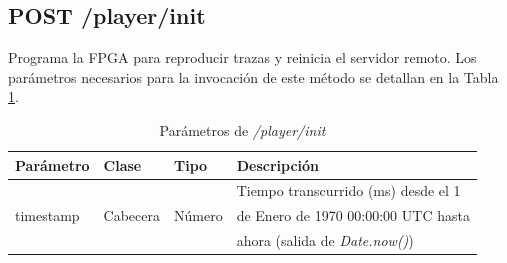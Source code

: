 %
%
\subsection{POST /player/init}

Programa la \gls{FPGA} para reproducir \glspl{traza} y reinicia el servidor remoto. Los parámetros necesarios para la invocación de este método se detallan en la Tabla \ref{extra:api:playerinit:invocacion}.

\begin{table}[H]
\centering
\begin{tabular}{|l|l|l|l|}
\hline
\rowcolor[HTML]{F5F5F5}
\textbf{Parámetro}  & \textbf{Clase} & \textbf{Tipo} & \textbf{Descripción}                  \\ \hline
                    &                &               & Tiempo transcurrido (ms) desde el 1   \\
timestamp           & Cabecera       & Número        & de Enero de 1970 00:00:00 UTC hasta   \\
                    &                &               & ahora (salida de \textit{Date.now()}) \\ \hline
\end{tabular}
\caption{Parámetros de \textit{/player/init}}
\label{extra:api:playerinit:invocacion}
\end{table}


